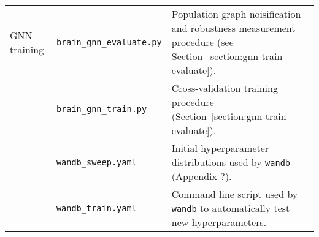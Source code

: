 \begin{center}
\begin{longtable}[]{p{}p{}p{}}
    GNN training
            & \texttt{brain\_gnn\_evaluate.py} & Population graph noisification and robustness measurement procedure (see Section~\ref{section:gnn-train-evaluate}). \\
            & \texttt{brain\_gnn\_train.py} & Cross-validation training procedure (Section~\ref{section:gnn-train-evaluate}). \\
            & \texttt{wandb\_sweep.yaml} & Initial hyperparameter distributions used by \texttt{wandb} (Appendix ?). \\
            & \texttt{wandb\_train.yaml} & Command line script used by \texttt{wandb} to automatically test new hyperparameters. \\
\end{longtable}
\end{center}